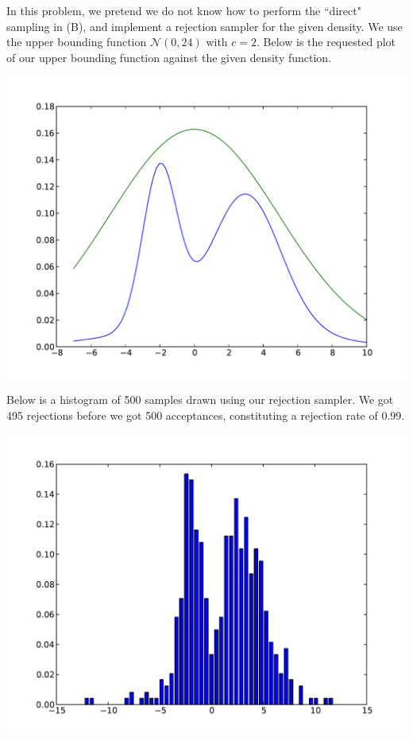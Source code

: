 \documentclass[solution, letterpaper]{cs121}
\begin{document}
\begin{empfile}
\subproblem %
In this problem, we pretend we do not know how to perform the ``direct" sampling in (B), and implement a rejection sampler for the given density. We use the upper bounding function $\mathcal{N}(0,24)$ with $c=2$. Below is the requested plot of our upper bounding function against the given density function.
\begin{center}
\includegraphics[scale=0.8]{mixture-w-envelope.pdf}
\end{center}

Below is a histogram of 500 samples drawn using our rejection sampler. We got 495 rejections before we got 500 acceptances, constituting a rejection rate of 0.99.
\begin{center}
\includegraphics[scale=0.8]{rejection-sample-histogram.pdf}
\end{center}


\end{empfile}
\end{document}
